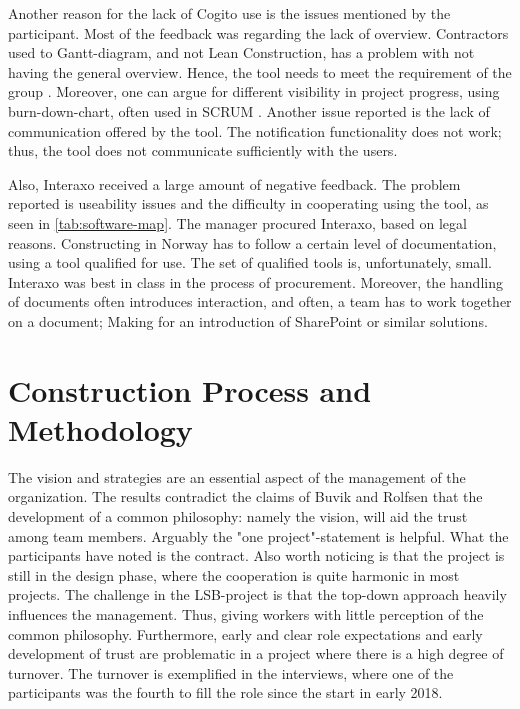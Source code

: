 Another reason for the lack of Cogito use is the issues mentioned by the participant. Most of the feedback was regarding the lack of overview. Contractors used to Gantt-diagram, and not Lean Construction, has a problem with not having the general overview. Hence, the tool needs to meet the requirement of the group \citep{subramanyam2010user}. Moreover, one can argue for different visibility in project progress, using burn-down-chart, often used in SCRUM \citep{sutherland}. Another issue reported is the lack of communication offered by the tool. The notification functionality does not work; thus, the tool does not communicate sufficiently with the users. 

Also, Interaxo received a large amount of negative feedback. The problem reported is useability issues and the difficulty in cooperating using the tool, as seen in \ref{tab:software-map}. The manager procured Interaxo, based on legal reasons. Constructing in Norway has to follow a certain level of documentation, using a tool qualified for use. The set of qualified tools is, unfortunately, small. Interaxo was best in class in the process of procurement. Moreover, the handling of documents often introduces interaction, and often, a team has to work together on a document; Making for an introduction of SharePoint or similar solutions. 

\section{Construction Process and Methodology} \label{sec:methodology}
The vision and strategies are an essential aspect of the management of the organization. The results contradict the claims of Buvik and Rolfsen \citep{rolfsen} that the development of a common philosophy: namely the vision, will aid the trust among team members. Arguably the "one project"-statement is helpful. What the participants have noted is the contract. Also worth noticing is that the project is still in the design phase, where the cooperation is quite harmonic in most projects. The challenge in the LSB-project is that the top-down approach heavily influences the management. Thus, giving workers with little perception of the common philosophy. Furthermore, early and clear role expectations and early development of trust are problematic in a project where there is a high degree of turnover. The turnover is exemplified in the interviews, where one of the participants was the fourth to fill the role since the start in early 2018.
     

